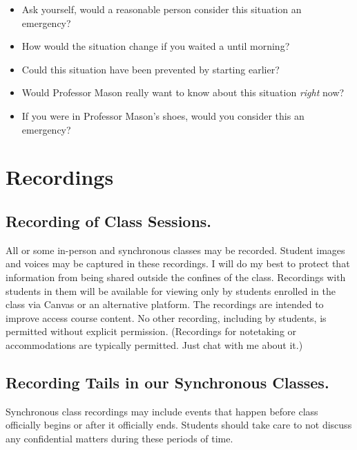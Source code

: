 \begin{itemize}
\tightlist
\item
  Ask yourself, would a reasonable person consider this situation an emergency?
\item
  How would the situation change if you waited a until morning?
\item
  Could this situation have been prevented by starting earlier?
\item
  Would Professor Mason really want to know about this situation \emph{right} now?
\item
  If you were in Professor Mason's shoes, would you consider this an emergency?
\end{itemize}

\hypertarget{recordings}{%
\section{Recordings}\label{recordings}}

\hypertarget{recording-of-class-sessions.}{%
\subsection{Recording of Class Sessions.}\label{recording-of-class-sessions.}}

All or some in-person and synchronous classes may be recorded. Student images and voices may be captured in these recordings. I will do my best to protect that information from being shared outside the confines of the class. Recordings with students in them will be available for viewing only by students enrolled in the class via Canvas or an alternative platform. The recordings are intended to improve access course content. No other recording, including by students, is permitted without explicit permission. (Recordings for notetaking or accommodations are typically permitted. Just chat with me about it.)

\hypertarget{recording-tails-in-our-synchronous-classes.}{%
\subsection{Recording Tails in our Synchronous Classes.}\label{recording-tails-in-our-synchronous-classes.}}

Synchronous class recordings may include events that happen before class officially begins or after it officially ends. Students should take care to not discuss any confidential matters during these periods of time.

